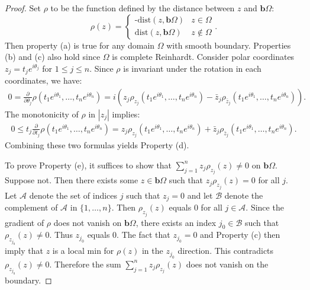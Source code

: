 \documentclass[reqno,12pt]{amsart}
\numberwithin{equation}{section}
\begin{document}
			\begin{proof}
				Set $\rho$ to be the function defined by the distance between $z$ and $\mathbf b\Omega$:
				$$\rho(z)=\begin{cases}
				\text{-dist$(z,\mathbf b\Omega)$}& z\in\Omega\\
				\text{dist$(z,\mathbf b\Omega)$}& z\notin\Omega
				\end{cases}.$$
				{Then {property} (a) is true for any domain $\Omega$ with smooth boundary. {Properties} (b) and (c) also hold since $\Omega$ is complete Reinhardt}. 
			 Consider polar coordinates $z_j=t_je^{i\theta_j}$ for $1\leq j\leq n$. Since $\rho$ is invariant under the rotation in each coordinates, we have:
				\begin{align}\label{02}
				0=\frac{\partial}{\partial \theta_j}\rho\left(t_1e^{i\theta_1},\dots,t_ne^{i\theta_n}\right)=i\left(z_j\rho_{z_j}(t_1e^{i\theta_1},\dots,t_ne^{i\theta_n})-\bar{z}_j\rho_{\bar{z}_j}(t_1e^{i\theta_1},\dots,t_ne^{i\theta_n})\right).\end{align}
				The monotonicity of $\rho$ in $|z_j|$ implies:
				\begin{align}\label{03}
				0\leq t_j\frac{\partial}{\partial t_j}\rho\left(t_1e^{i\theta_1},\dots,t_ne^{i\theta_n}\right)=z_j\rho_{z_j}(t_1e^{i\theta_1},\dots,t_ne^{i\theta_n})+\bar{z}_j\rho_{\bar{z}_j}(t_1e^{i\theta_1},\dots,t_ne^{i\theta_n}). 
				\end{align}
				Combining these two formulas yields Property (d). 
				
				To prove Property (e), it suffices to show that $\sum_{j=1}^{n}z_j\rho_{z_j}(z)\neq0$ on $\mathbf b\Omega$. Suppose not. Then there exists some $z\in\mathbf b\Omega$ such that $z_j\rho_{z_j}(z)=0$ for all $j$. Let $\mathcal A$ denote the set of indices $j$ such that $z_j=0$ and let $\mathcal B$ denote the complement of $\mathcal A$ in $\{1,\dots, n\}$. Then $\rho_{z_j}(z)$ equals 0 for all $j\in \mathcal A$. Since the gradient of $\rho$ does not vanish on $\mathbf b\Omega$, there exists an index $j_0\in \mathcal B$ such that $\rho_{z_{j_0}}(z)\neq 0$. Thus $z_{j_0}$ equals 0. The fact that $z_{j_0}=0$ and Property (c) then imply that $z$ is a local min for $\rho(z)$ in the $z_{j_0}$ direction. This contradicts $\rho_{z_{j_0}}(z)\neq 0$. Therefore the sum $\sum_{j=1}^{n}z_j\rho_{z_j}(z)$ does not vanish on the boundary.
			\end{proof}
				
\end{document}
